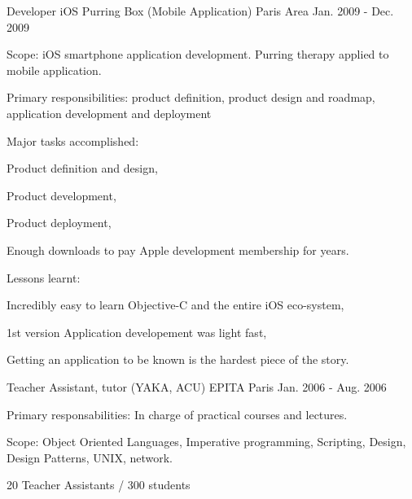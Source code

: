 \begin{cventries}
  \cventry
    {Developer iOS} %
    {Purring Box (Mobile Application)} %
    {Paris Area} %
    {Jan. 2009 - Dec. 2009} %
    {
      \begin{cvitems} %
        \item {Scope: iOS smartphone application development. Purring therapy applied to mobile application.}
        \item {Primary responsibilities: product definition, product design and roadmap, application development and deployment}
        \item {Major tasks accomplished:}
        \begin{cvsubitems}
          \item {Product definition and design,}
          \item {Product development,}
          \item {Product deployment,}
          \item {Enough downloads to pay Apple development membership for years.}
        \end{cvsubitems}
        \item {Lessons learnt:}
        \begin{cvsubitems}
          \item {Incredibly easy to learn Objective-C and the entire iOS eco-system,}
          \item {1st version Application developement was light fast,}
          \item {Getting an application to be known is the hardest piece of the story.}
        \end{cvsubitems}
      \end{cvitems}
    }

  \cventry
    {Teacher Assistant, tutor (YAKA, ACU)} %
    {EPITA} %
    {Paris} %
    {Jan. 2006 - Aug. 2006} %
    {
      \begin{cvitems} %
        \item {Primary responsabilities: In charge of practical courses and lectures.}
        \item {Scope: Object Oriented Languages, Imperative programming, Scripting, Design, Design Patterns, UNIX, network.}
        \item {20 Teacher Assistants / 300 students}
      \end{cvitems}
    }


\end{cventries}
